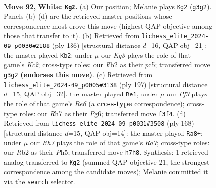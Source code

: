 \documentclass[11pt]{article}
\begin{document}
\clearpage

\begin{figure}[p]\centering
\begin{subfigure}{0.46\textwidth}\centering
\resizebox{\linewidth}{!}{%
\newchessgame
\chessboard[
  setfen={8/7R/3kpp2/8/P1r1P3/5PK1/1R6/8 w - - 10 92},
  showmover=false,
  pgfstyle=straightmove, color=movearrow, markmove={g3-g2}
]}
\caption{}
\end{subfigure}\hfill
\begin{subfigure}{0.46\textwidth}\centering
\resizebox{\linewidth}{!}{%
\newchessgame
\chessboard[
  setfen={8/P5R1/2k5/2pp4/5p2/r4P2/2K2P2/8 w - - 0 94},
  showmover=false,
  pgfstyle=straightmove, color=movearrow, markmove={c2-b2}
]}
\caption{}
\end{subfigure}
\\[4pt]
\begin{subfigure}{0.46\textwidth}\centering
\resizebox{\linewidth}{!}{%
\newchessgame
\chessboard[
  setfen={8/4R2p/6pP/3k2P1/4p1K1/4r3/8/8 b - - 3 99},
  showmover=false,
  pgfstyle=straightmove, color=movearrow, markmove={e3-e1}
]}
\caption{}
\end{subfigure}\hfill
\begin{subfigure}{0.46\textwidth}\centering
\resizebox{\linewidth}{!}{%
\newchessgame
\chessboard[
  setfen={6k1/R7/5p1p/5P1P/6P1/5K2/8/6r1 w - - 79 85},
  showmover=false,
  pgfstyle=straightmove, color=movearrow, markmove={a7-a8}
]}
\caption{}
\end{subfigure}
\caption{\textbf{Move 92, White: \texttt{Kg2}.} (a) Our position; Melanie plays \texttt{Kg2} (\texttt{g3g2}). Panels (b)--(d) are the retrieved master positions whose correspondence most drove this move (highest QAP objective among those that transfer to it). (b) Retrieved from \texttt{lichess\_elite\_2024-09\_p0030\#2188} (ply 186) [structural distance $d$=16, QAP obj=21]: the master played \texttt{Kb2}; under $\mu$ our \emph{Kg3} plays the role of that game's \emph{Kc2}; cross-type roles: our \emph{R}b2 as their \emph{p}c5; transferred move \texttt{g3g2} \textbf{(endorses this move)}. (c) Retrieved from \texttt{lichess\_elite\_2024-09\_p0005\#3138} (ply 197) [structural distance $d$=15, QAP obj=32]: the master played \texttt{Re1}; under $\mu$ our \emph{Pf3} plays the role of that game's \emph{Re6} (a \textbf{cross-type} correspondence); cross-type roles: our \emph{R}h7 as their \emph{P}g6; transferred move \texttt{f3f4}. (d) Retrieved from \texttt{lichess\_elite\_2024-09\_p0031\#3508} (ply 168) [structural distance $d$=15, QAP obj=14]: the master played \texttt{Ra8+}; under $\mu$ our \emph{Rh7} plays the role of that game's \emph{Ra7}; cross-type roles: our \emph{R}b2 as their \emph{P}h5; transferred move \texttt{h7h8}. Synthesis: 1 retrieved analog transferred to \texttt{Kg2} (summed QAP objective 21, the strongest correspondence among the candidate moves); Melanie committed it via the \texttt{search} selector.}
\label{fig:thought-m182}
\end{figure}
\end{document}
